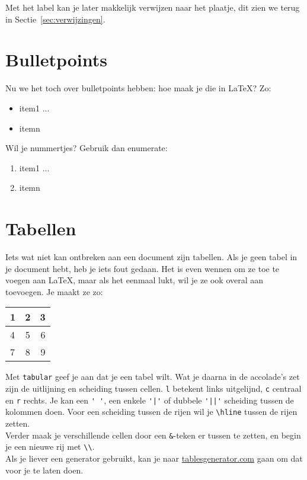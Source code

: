 \documentclass[a4paper,10pt]{article}
\begin{document}
Met het label kan je later makkelijk verwijzen naar het plaatje, dit zien we terug in Sectie~\ref{sec:verwijzingen}. 

\section{Bulletpoints}
Nu we het toch over bulletpoints hebben: hoe maak je die in \LaTeX? Zo:

\begin{verbbox}
\begin{itemize}
\item item1 ... 
\item itemn
\end{itemize}
\end{verbbox}
\theverbbox

Wil je nummertjes? Gebruik dan enumerate:

\begin{verbbox}
\begin{enumerate}
\item item1 ... 
\item itemn
\end{enumerate}
\end{verbbox}
\theverbbox


\section{Tabellen}
Iets wat niet kan ontbreken aan een document zijn tabellen. Als je geen tabel in je document hebt, heb je iets fout gedaan. Het is even wennen om ze toe te voegen aan \LaTeX, maar als het eenmaal lukt, wil je ze ook overal aan toevoegen. Je maakt ze zo:

\begin{verbbox}
\begin{tabular}{ l || c r }
  1 & 2 & 3 \\
  \hline
  4 & 5 & 6 \\
  7 & 8 & 9 \\
\end{tabular}
\end{verbbox}
\theverbbox

Met \verb|tabular| geef je aan dat je een tabel wilt. Wat je daarna in de accolade's zet zijn de uitlijning en scheiding tussen cellen. \verb|l| betekent links uitgelijnd, \verb|c| centraal en \verb|r| rechts. Je kan een \verb|' '|, een enkele \verb+'|'+ of dubbele \verb+'||'+ scheiding tussen de kolommen doen. Voor een scheiding tussen de rijen wil je \verb|\hline| tussen de rijen zetten.\\
Verder maak je verschillende cellen door een \verb|&|-teken er tussen te zetten, en begin je een nieuwe rij met \verb|\\|.\\
Als je liever een generator gebruikt, kan je naar \href{http://www.tablesgenerator.com/}{tablesgenerator.com} gaan om dat voor je te laten doen.
\end{document}
